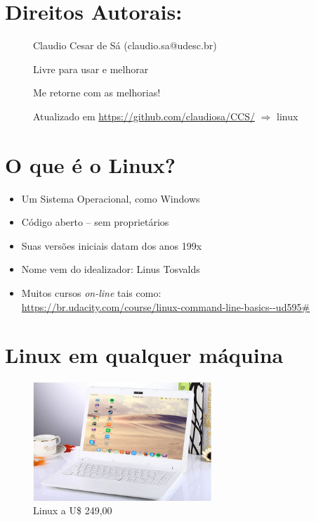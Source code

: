 \documentclass[final,a4paper]{article}
\begin{document}
\section{Direitos Autorais:}
\begin{description}

  \item[]  Claudio Cesar de Sá (\textsf{claudio.sa@udesc.br})
  \item[]  Livre para usar e melhorar
  \item[]  Me retorne com as melhorias! 
    \item[] Atualizado em \url{https://github.com/claudiosa/CCS/} $\Rightarrow $ linux
\end{description}





\tableofcontents

\section{O que é o Linux?}
\begin{itemize}
  \item Um Sistema Operacional, como Windows
  \item Código aberto -- sem proprietários
  \item Suas versões iniciais datam dos anos 199x
  \item Nome vem do idealizador: Linus Tosvalds
  \item Muitos cursos \textit{on-line} tais como:\\
  \url{https://br.udacity.com/course/linux-command-line-basics--ud595#}
\end{itemize}


\section{Linux em qualquer máquina}

\begin{figure}[!htb]
\centering
\includegraphics[width=0.6\textwidth , height=0.6\textheight]{figuras/linux-laptops-notebook.jpg}
 \caption{Linux a U\$ 249,00}
\end{figure}
\end{document}
